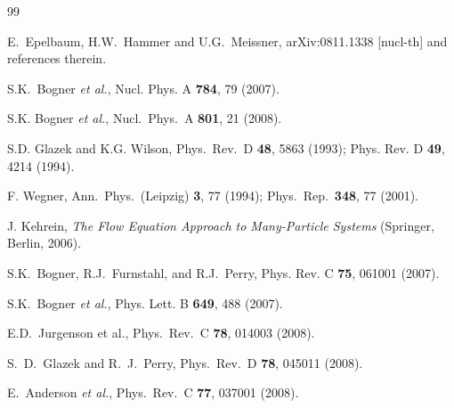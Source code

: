 \documentclass[prc,twocolumn,showpacs,floatfix,nofootinbib,superscriptaddress]{revtex4}
\begin{document}
\begin{thebibliography}{99} 

  E.~Epelbaum, H.W.~Hammer and U.G.~Meissner,
  arXiv:0811.1338 [nucl-th] and references therein.

 S.K.~Bogner \textit{et al.}, 
  Nucl. Phys.  A {\bf 784}, 79 (2007).

  S.K. Bogner \textit{et al.}, 
   Nucl.\ Phys.\  A {\bf 801}, 21 (2008). 

 S.D. Glazek and K.G. Wilson, Phys.\ Rev.\ 
  D \textbf{48}, 5863 (1993); Phys. Rev. D \textbf{49}, 4214 (1994).

 F. Wegner, Ann.\ Phys.\ (Leipzig) \textbf{3}, 77 (1994);
  Phys.\ Rep.\ {\bf 348}, 77 (2001).

J. Kehrein, {\it The Flow Equation Approach to Many-Particle Systems\/}
    (Springer, Berlin, 2006).

 S.K.~Bogner, R.J.~Furnstahl, and R.J.~Perry,
Phys. Rev. C {\bf 75}, 061001 (2007).

S.K.~Bogner \textit{et al.}, 
Phys. Lett. B {\bf 649}, 488 (2007).

  E.D.~Jurgenson et al., 
  Phys.\ Rev.\  C {\bf 78}, 014003 (2008).

  S.~D.~Glazek and R.~J.~Perry,
  Phys.\ Rev.\  D {\bf 78}, 045011 (2008).

  E.~Anderson \textit{et al.}, 
  Phys.\ Rev.\  C {\bf 77}, 037001 (2008).
  

\end{thebibliography}
\end{document}
